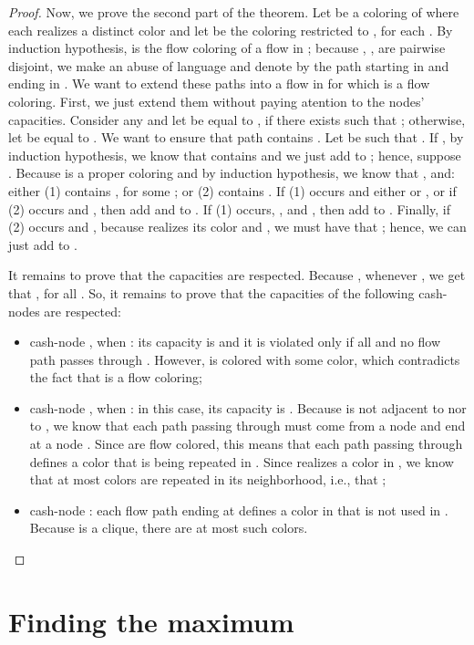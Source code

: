 \documentclass{llncs}
\begin{document}
\begin{proof}
Now, we prove the second part of the theorem. Let  be a coloring of  where each  realizes a distinct color and let  be the coloring  restricted to , for each . By induction hypothesis,  is the flow coloring of a flow in ; because , , are pairwise disjoint, we make an abuse of language and denote by  the path starting in  and ending in . We want to extend these paths into a flow in  for which  is a flow coloring. First, we just extend them without paying atention to the nodes' capacities. Consider any  and let  be equal to , if there exists  such that ; otherwise, let  be equal to . We want to ensure that path  contains . Let  be such that . If , by induction hypothesis, we know that  contains  and we just add  to ; hence, suppose . Because  is a proper coloring and by induction hypothesis, we know that , and: either (1)  contains , for some ; or (2)  contains . If (1) occurs and either  or , or if (2) occurs and , then add  and  to . If (1) occurs, , and , then add  to . Finally, if (2) occurs and , because  realizes its color and , we must have that ; hence, we can just add  to .

It remains to prove that the capacities are respected. Because , whenever , we get that , for all . So, it remains to prove that the capacities of the following cash-nodes are respected:
\begin{itemize}
 \item cash-node , when : its capacity is  and it is violated only if all  and no flow path passes through . However,  is colored with some color, which contradicts the fact that  is a flow coloring;
 
 \item cash-node , when : in this case, its capacity is . Because  is not adjacent to  nor to , we know that each path passing through  must come from a node  and end at a node . Since  are flow colored, this means that each path passing through  defines a color that is being repeated in . Since  realizes a color in , we know that at most  colors are repeated in its neighborhood, i.e., that ;
 
 \item cash-node : each flow path ending at  defines a color in  that is not used in . Because  is a clique, there are at most  such colors.
\end{itemize}
\end{proof}

\section{Finding the maximum }\label{sec:dynalg}
\end{document}
